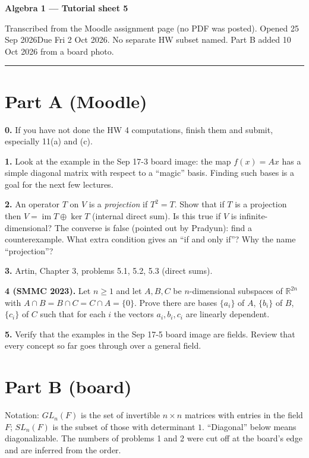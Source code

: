 \documentclass[11pt,a4paper]{article}
\newcommand{\prob}[1]{\textbf{#1}\quad}
\begin{document}
{\Large\bfseries Algebra 1 --- Tutorial sheet 5}\par\vspace{-4pt}
{\small\sffamily Transcribed from the Moodle assignment page (no PDF was posted). Opened 25 Sep 2026\quad Due Fri 2 Oct 2026. No separate HW subset named. Part B added 10 Oct 2026 from a board photo.}\par\vspace{2pt}\hrule

\section*{\large Part A (Moodle)}
\prob{0.} If you have not done the HW 4 computations, finish them and submit, especially 11(a) and (c).

\prob{1.} Look at the example in the Sep 17-3 board image: the map $f(x)=Ax$ has a simple diagonal matrix with respect to a ``magic'' basis. Finding such bases is a goal for the next few lectures.

\prob{2.} An operator $T$ on $V$ is a \emph{projection} if $T^2=T$. Show that if $T$ is a projection then $V=\operatorname{im}T\oplus\ker T$ (internal direct sum). Is this true if $V$ is infinite-dimensional? The converse is false (pointed out by Pradyun): find a counterexample. What extra condition gives an ``if and only if''? Why the name ``projection''?

\prob{3.} Artin, Chapter 3, problems 5.1, 5.2, 5.3 (direct sums).

\prob{4 (SMMC 2023).} Let $n\ge1$ and let $A,B,C$ be $n$-dimensional subspaces of $\mathbb{R}^{2n}$ with $A\cap B=B\cap C=C\cap A=\{0\}$. Prove there are bases $\{a_i\}$ of $A$, $\{b_i\}$ of $B$, $\{c_i\}$ of $C$ such that for each $i$ the vectors $a_i,b_i,c_i$ are linearly dependent.

\prob{5.} Verify that the examples in the Sep 17-5 board image are fields. Review that every concept so far goes through over a general field.

\section*{\large Part B (board)}
{\small\sffamily Notation: $GL_n(F)$ is the set of invertible $n\times n$ matrices with entries in the field $F$; $SL_n(F)$ is the subset of those with determinant $1$. ``Diagonal'' below means diagonalizable. The numbers of problems 1 and 2 were cut off at the board's edge and are inferred from the order.}
\end{document}
